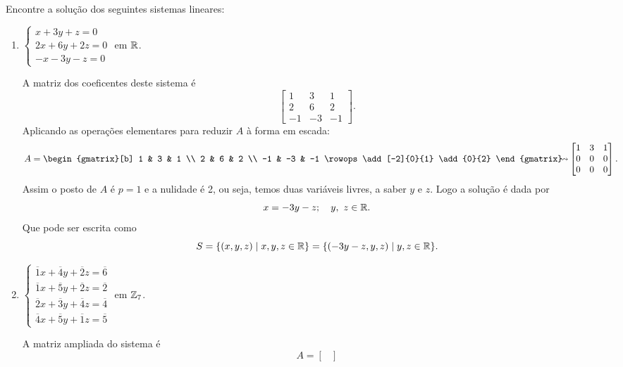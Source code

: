 \begin{exemplo}
Encontre a solu\c{c}\~ao dos seguintes sistemas lineares:
\begin{enumerate}
	\item $\begin{cases}
	x + 3y + z = 0\\
	2x + 6y + 2z = 0\\
	-x - 3y - z = 0
	\end{cases}$ em $\mathbb{R}$.
	\begin{solucao}
	A matriz dos coeficentes deste sistema \'e
	\[
	\begin{bmatrix}
	1 & 3 & 1\\
	2 & 6 & 2\\
	-1 & -3 & -1
	\end{bmatrix}.
	\]
	Aplicando as opera\c{c}\~oes elementares para reduzir $A$ \`a forma em escada:
	\begin{align*}
	A = \begin{gmatrix}[b]
	1 & 3 & 1 \\
	2 & 6 & 2 \\
	-1 & -3 & -1 
	\rowops
	\add[-2]{0}{1}
	\add{0}{2}
	\end{gmatrix}\kern-6.23pt\leadsto&\begin{bmatrix}
	1 & 3 & 1 \\
	0 & 0 & 0 \\
	0 & 0 & 0 
	\end{bmatrix}.
	\end{align*}
	Assim o posto de $A$ \'e $p = 1$ e a nulidade \'e 2, ou seja, temos duas vari\'aveis livres, a saber $y$ e $z$. Logo a solu\c{c}\~ao \'e dada por
	\[
	x = -3y - z;\quad y,\ z \in \mathbb{R}.
	\]
	Que pode ser escrita como
	\[
	S = \{(x, y ,z) \mid x, y, z \in \mathbb{R} \} = \{(-3y - z, y, z) \mid y, z \in \mathbb{R}\}.
	\]
	\end{solucao}
	\item $\begin{cases}
	\overline{1}x + \overline{4}y + \overline{2}z = \overline{6}\\
	\overline{1}x + \overline{5}y + \overline{2}z = \overline{2}\\
	\overline{2}x + \overline{3}y + \overline{4}z = \overline{4}\\
	\overline{4}x + \overline{5}y + \overline{1}z = \overline{5}
	\end{cases}$ em $\mathbb{Z}_7$.
	\begin{solucao}
	A matriz ampliada do sistema \'e
	\[
	A = \begin{bmatrix}

\end{bmatrix}\]
\end{solucao}
\end{enumerate}
\end{exemplo}
